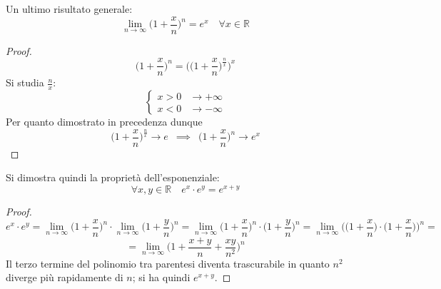 \documentclass[10pt, oneside]{book}
\theoremstyle{plain}
\begin{document}
Un ultimo risultato generale:
\[\lim \limits_{n \rightarrow \infty} \bigg(1 + \frac{x}{n}\bigg)^{n} = e^x \quad \forall x \in \mathbb{R}\]
\begin{proof}
    \[\bigg(1 + \frac{x}{n}\bigg)^{n} = \Bigg(\bigg(1 + \frac{x}{n}\bigg)^{\frac{n}{x}}\Bigg)^x\]
    Si studia $\frac{n}{x}$:
    \[\begin{cases}
        x > 0 & \rightarrow +\infty\\
        x < 0 & \rightarrow - \infty
    \end{cases}\]
    Per quanto dimostrato in precedenza dunque 
    \[\bigg(1 + \frac{x}{n}\bigg)^{\frac{n}{x}} \rightarrow e \enspace \implies \enspace \bigg(1 + \frac{x}{n}\bigg)^{n} \rightarrow e^x\]
\end{proof}
Si dimostra quindi la proprietà dell'esponenziale:
\[\forall x, y \in \mathbb{R} \quad e^x \cdot e^y = e^{x+y}\]
\begin{proof}
    \[e^x \cdot e^y = \lim \limits_{n \rightarrow \infty} \bigg(1 + \frac{x}{n}\bigg)^{n} \cdot \lim \limits_{n \rightarrow \infty} \bigg(1 + \frac{y}{n}\bigg)^{n} = \lim \limits_{n \rightarrow \infty} \bigg(1 + \frac{x}{n}\bigg)^{n} \cdot \bigg(1 + \frac{y}{n}\bigg)^{n} = \lim \limits_{n \rightarrow \infty} \Bigg(\bigg(1 + \frac{x}{n}\bigg) \cdot \bigg(1 + \frac{x}{n}\bigg) \Bigg)^{n} =\]
    \[= \lim \limits_{n \rightarrow \infty} \bigg(1 + \frac{x+y}{n} + \frac{xy}{n^2}\bigg)^{n}\]
    Il terzo termine del polinomio tra parentesi diventa trascurabile in quanto $n^2$ diverge più rapidamente di $n$; si ha quindi $e^{x+y}$.

    
\end{proof}
\end{document}
